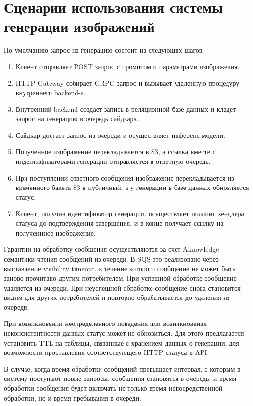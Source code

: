 \section{Сценарии использования системы генерации изображений}
По умолчанию запрос на генерацию состоит из следующих шагов:
\begin{enumerate}
  \item Клиент отправляет POST запрос с промптом и параметрами изображения.
  \item HTTP Gateway собирает GRPC запрос и вызывает удаленную процедуру внутреннего backend-а.
  \item Внутренний backend создает запись в реляционной базе данных и кладет запрос на генерацию в очередь сайдкара.
  \item Сайдкар достает запрос из очереди и осуществляет инференс модели.
  \item Полученное изображение перекладывается в S3, а ссылка вместе с индентификаторами генерации отправляется в ответную очередь.
  \item При поступлении ответного сообщения изображение перекладывается из временного бакета S3 в публичный, а у генерации в базе данных обновляется статус.
  \item Клиент, получив идентификатор генерации, осуществляет поллинг хендлера статуса до подтверждения завершения, и в конце получает ссылку на полученнное изображение.
\end{enumerate}

Гарантии на обработку сообщения осуществляются за счет Aknowledge семантики чтения сообщений из очереди. 
В SQS это реализовано через выставление visibility timeout, в течение которого сообщение не может быть заново прочитано другим
потребителем. При успешной обработке сообщение удаляется из очереди. При неуспешной обработке сообщение снова становится 
видим для других потребителей и повторно обрабатывается до удаления из очереди.

При возникновении неопределенного поведения или возникновения неконсистентности данных статус может не обновиться.
Для этого предлагается установить TTL на таблицы, связанные с хранением данных о генерации, для 
возможности проставления соответствующего HTTP статуса в API.

В случае, когда время обработки сообщений превышает интервал, с которым в систему
поступают новые запросы, сообщения становятся в очередь, и время обработки сообщения будет 
включать не только время непосредственной обработки, но и время пребывания в очереди.

